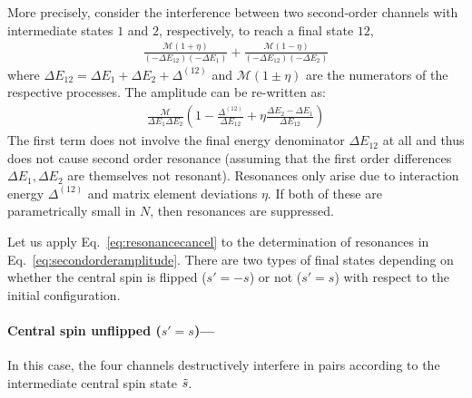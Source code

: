 \documentclass[aps,pra,twocolumn,a4paper,showpacs,superscriptaddress,floatfix,10pt]{revtex4}
\begin{document}
\begin{widetext}
More precisely, consider the interference between two second-order channels with intermediate states $1$ and $2$, respectively, to reach a final state $12$,
\begin{align}
	\frac{\mathcal{M}(1+\eta)}{(-\Delta E_{12})(-\Delta E_1)}+\frac{\mathcal{M}(1-\eta)}{(-\Delta E_{12})(-\Delta E_2)}
\end{align}
where $\Delta E_{12} = \Delta E_1 + \Delta E_2 + \Delta^{(12)}$ and $\mathcal{M}(1\pm\eta)$ are the numerators of the respective processes. The amplitude can be re-written as:
\begin{align}
\label{eq:resonancecancel}
	\frac{\mathcal{M}}{\Delta E_1 \Delta E_2}\left(1 - \frac{\Delta^{(12)}}{\Delta E_{12}} + \eta \frac{\Delta E_2 - \Delta E_1}{\Delta E_{12}}\right)
\end{align}
The first term does not involve the final energy denominator $\Delta E_{12}$ at all and thus does not cause second order resonance (assuming that the first order differences $\Delta E_1, \Delta E_2$ are themselves not resonant).
Resonances only arise due to interaction energy $\Delta^{(12)}$ and matrix element deviations $\eta$. If both of these are parametrically small in $N$, then resonances are suppressed.

Let us apply Eq.~\eqref{eq:resonancecancel} to the determination of resonances in Eq.~\eqref{eq:secondorderamplitude}. There are two types of final states depending on whether the central spin is flipped ($s' = - s$) or not ($s' = s$) with respect to the initial configuration.

\paragraph{Central spin unflipped ($s' = s$)---}%
In this case, the four channels destructively interfere in pairs according to the intermediate central spin state $\tilde{s}$.


\end{widetext}
\end{document}
